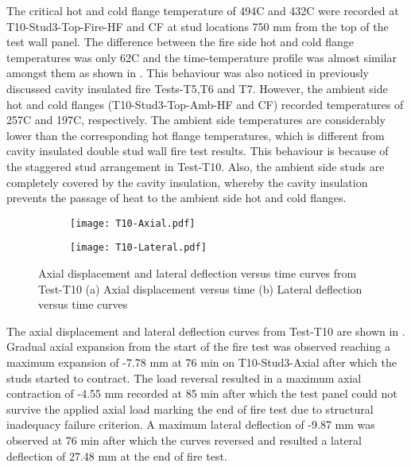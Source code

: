 The critical hot and cold flange temperature of 494\degree C and 432\degree C were recorded at T10-Stud3-Top-Fire-HF and CF at stud locations 750 mm from the top of the test wall panel. The difference between the fire side hot and cold flange temperatures was only 62\degree C and the time-temperature profile was almost similar amongst them as shown in . This behaviour was also noticed in previously discussed cavity insulated fire Tests-T5,T6 and T7. However, the ambient side hot and cold flanges (T10-Stud3-Top-Amb-HF and CF) recorded temperatures of 257\degree C and 197\degree C, respectively. The ambient side temperatures are considerably lower than the corresponding hot flange temperatures, which is different from cavity insulated double stud wall fire test results. This behaviour is because of the staggered stud arrangement in Test-T10. Also, the ambient side studs are completely covered by the cavity insulation, whereby the cavity insulation prevents the passage of heat to the ambient side hot and cold flanges.   
\begin{figure}[!htbp]
	\centering
	\begin{subfigure}[b]{0.7\textwidth}
		\centering
		\texttt{[image: T10-Axial.pdf]}
		\caption{}
		\label{subfig:T10-Axial}
	\end{subfigure}
	\begin{subfigure}[b]{0.7\textwidth}
		\centering
		\texttt{[image: T10-Lateral.pdf]}
		\caption{}
		\label{subfig:T10-Lateral}
	\end{subfigure}
	   \caption{Axial displacement and lateral deflection versus time curves from Test-T10 (a) Axial displacement versus time (b) Lateral deflection versus time curves}
	   \label{fig:T10-displacement}
\end{figure}

The axial displacement and lateral deflection curves from Test-T10 are shown in . Gradual axial expansion from the start of the fire test was observed reaching a maximum expansion of -7.78 mm at 76 min on T10-Stud3-Axial after which the studs started to contract. The load reversal resulted in a maximum axial contraction of -4.55 mm recorded at 85 min after which the test panel could not survive the applied axial load marking the end of fire test due to structural inadequacy failure criterion. A maximum lateral deflection of -9.87 mm was observed at 76 min after which the curves reversed and resulted a lateral deflection of 27.48 mm at the end of fire test.

